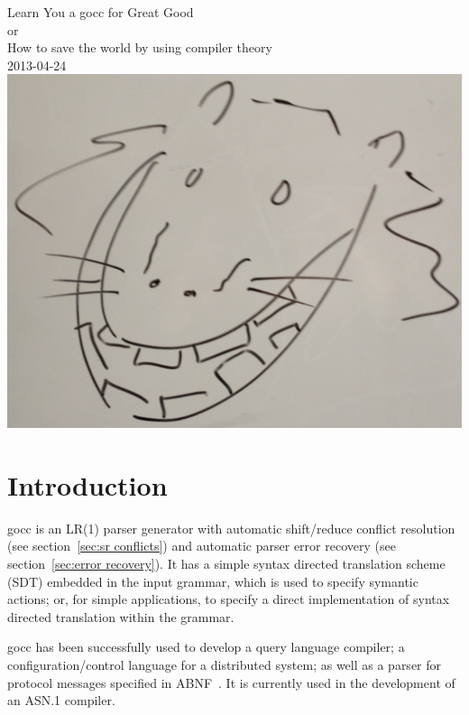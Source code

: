 \documentclass[12pt]{article}
\begin{document}
\begin{center}
	{\Huge Learn You a gocc for Great Good} \\
	{\large or \\
	How to save the world by using compiler theory \\
	\vspace{1cm}
	2013-04-24}\\
	\vspace{1cm}
	\includegraphics[scale=.1]{gocc}
\end{center}
\tableofcontents

\newcommand{\TBD}{\textcolor{red}{TBD}}
\newcommand{\TBDx}[1]{\textcolor{red}{TBD:} #1}
\newcommand{\Go}{{\em Go}\ }
\newcommand{\Code}[1]{{\bf #1} } 
\newcommand{\gocc}{{\em gocc}\ }

\section{Introduction}
	gocc is an LR(1) parser generator with automatic shift/reduce conflict resolution (see section~\ref{sec:sr conflicts}) and automatic parser error recovery (see section~\ref{sec:error recovery}). It has a simple syntax directed translation scheme (SDT) embedded in the input grammar, which is used to specify symantic actions; or, for simple applications, to specify a direct implementation of syntax directed translation within the grammar.

	gocc has been successfully used to develop a query language compiler; a configuration/control language for a distributed system; as well as a parser for protocol messages specified in ABNF~\cite{ABNF}. It is currently used in the development of an ASN.1 compiler.
\end{document}
